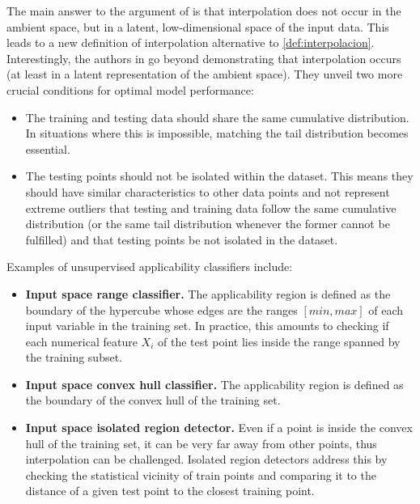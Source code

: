 \indent The main answer to the argument of \cite{balestriero2021learning} is that interpolation does not occur in the ambient space, but in a latent, low-dimensional space of the input data\cite{bonnasse2022interpolation}. This leads to a new definition of interpolation alternative to \cref{def:interpolacion}.\\
%
\indent Interestingly, the authors in \cite{bonnasse2022interpolation} go beyond demonstrating that interpolation occurs (at least in a latent representation of the ambient space). They unveil two more crucial conditions for optimal model performance:
%
\begin{itemize}
	\item The training and testing data should share the same cumulative distribution. In situations where this is impossible, matching the tail distribution becomes essential.
	\item The testing points should not be isolated within the dataset. This means they should have similar characteristics to other data points and not represent extreme outliers that testing and training data follow the same cumulative distribution (or the same tail distribution whenever the former cannot be fulfilled) and that testing points be not isolated in the dataset.\\
\end{itemize}
%
Examples of unsupervised applicability classifiers include:
\begin{itemize}
	\item \textbf{Input space range classifier.} The applicability region is defined as the boundary of the hypercube whose edges are the ranges $[min, max]$ of each input variable in the training set. In practice, this amounts to checking if each numerical feature $X_i$ of the test point lies inside the range spanned by the training subset.
	\item \textbf{Input space convex hull classifier.} The applicability region is defined as the boundary of the convex hull of the training set.
	\item \textbf{Input space isolated region detector.} Even if a point is inside the convex hull of the training set, it can be very far away from other points, thus interpolation can be challenged. Isolated region detectors address this by checking the statistical vicinity of train points and comparing it to the distance of a given test point to the closest training point.\\
\end{itemize}

